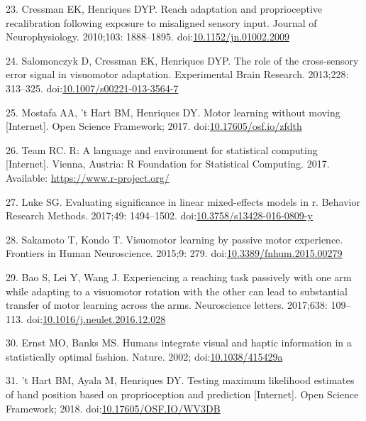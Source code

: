 \documentclass[10pt,letterpaper]{article}
\begin{document}
\hypertarget{ref-Cressman2010}{}
23. Cressman EK, Henriques DYP. Reach adaptation and proprioceptive
recalibration following exposure to misaligned sensory input. Journal of
Neurophysiology. 2010;103: 1888--1895.
doi:\href{https://doi.org/10.1152/jn.01002.2009}{10.1152/jn.01002.2009}

\hypertarget{ref-Salomonczyk2013}{}
24. Salomonczyk D, Cressman EK, Henriques DYP. The role of the
cross-sensory error signal in visuomotor adaptation. Experimental Brain
Research. 2013;228: 313--325.
doi:\href{https://doi.org/10.1007/s00221-013-3564-7}{10.1007/s00221-013-3564-7}

\hypertarget{ref-Mostafa2017}{}
25. Mostafa AA, 't Hart BM, Henriques DY. Motor learning without moving
{[}Internet{]}. Open Science Framework; 2017.
doi:\href{https://doi.org/10.17605/osf.io/zfdth}{10.17605/osf.io/zfdth}

\hypertarget{ref-RCoreTeam2017}{}
26. Team RC. R: A language and environment for statistical computing
{[}Internet{]}. Vienna, Austria: R Foundation for Statistical Computing.
2017. Available: \url{https://www.r-project.org/}

\hypertarget{ref-Luke2017}{}
27. Luke SG. Evaluating significance in linear mixed-effects models in
r. Behavior Research Methods. 2017;49: 1494--1502.
doi:\href{https://doi.org/10.3758/s13428-016-0809-y}{10.3758/s13428-016-0809-y}

\hypertarget{ref-Sakamoto2015}{}
28. Sakamoto T, Kondo T. Visuomotor learning by passive motor
experience. Frontiers in Human Neuroscience. 2015;9: 279.
doi:\href{https://doi.org/10.3389/fnhum.2015.00279}{10.3389/fnhum.2015.00279}

\hypertarget{ref-Bao2017}{}
29. Bao S, Lei Y, Wang J. Experiencing a reaching task passively with
one arm while adapting to a visuomotor rotation with the other can lead
to substantial transfer of motor learning across the arms. Neuroscience
letters. 2017;638: 109--113.
doi:\href{https://doi.org/10.1016/j.neulet.2016.12.028}{10.1016/j.neulet.2016.12.028}

\hypertarget{ref-Ernst2002}{}
30. Ernst MO, Banks MS. Humans integrate visual and haptic information
in a statistically optimal fashion. Nature. 2002;
doi:\href{https://doi.org/10.1038/415429a}{10.1038/415429a}

\hypertarget{ref-tHart2018}{}
31. 't Hart BM, Ayala M, Henriques DY. Testing maximum likelihood
estimates of hand position based on proprioception and prediction
{[}Internet{]}. Open Science Framework; 2018.
doi:\href{https://doi.org/10.17605/OSF.IO/WV3DB}{10.17605/OSF.IO/WV3DB}
\end{document}
